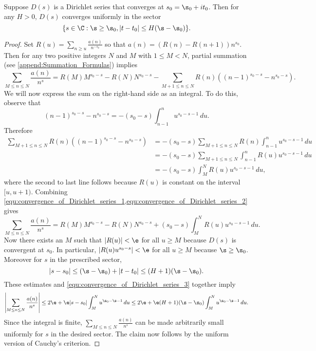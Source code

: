    \begin{theorem}\label{thm:convergence_of_Dirichlet_series}
      Suppose $D(s)$ is a Dirichlet series that converges at $s_{0} = \s_{0}+it_{0}$. Then for any $H > 0$, $D(s)$ converges uniformly in the sector
      \[
        \{s \in \C:\s \ge \s_{0}, |t-t_{0}| \le H(\s-\s_{0})\}.
      \]
    \end{theorem}
    \begin{proof}
      Set $R(u) = \sum_{n \ge u}\frac{a(n)}{n^{-s_{0}}}$ so that $a(n) = (R(n)-R(n+1))n^{s_{0}}$. Then for any two positive integers $N$ and $M$ with $1 \le M < N$, partial summation (see \cref{append:Summation_Formulas}) implies
      \begin{equation}\label{equ:convergence_of_Dirichlet_series_1}
        \sum_{M \le n \le N}\frac{a(n)}{n^{s}} = R(M)M^{s_{0}-s}-R(N)N^{s_{0}-s}-\sum_{M+1 \le n \le N}R(n)((n-1)^{s_{0}-s}-n^{s_{0}-s}).
      \end{equation}
      We will now express the sum on the right-hand side as an integral. To do this, observe that
      \[
        (n-1)^{s_{0}-s}-n^{s_{0}-s} = -(s_{0}-s)\int_{n-1}^{n}u^{s_{0}-s-1}\,du.
      \]
      Therefore
      \begin{equation}\label{equ:convergence_of_Dirichlet_series_2}
        \begin{aligned}
          \sum_{M+1 \le n \le N}R(n)((n-1)^{s_{0}-s}-n^{s_{0}-s}) &= -(s_{0}-s)\sum_{M+1 \le n \le N}R(n)\int_{n-1}^{n}u^{s_{0}-s-1}\,du \\
          &= -(s_{0}-s)\sum_{M+1 \le n \le N}\int_{n-1}^{n}R(u)u^{s_{0}-s-1}\,du \\
          &= -(s_{0}-s)\int_{M}^{N}R(u)u^{s_{0}-s-1}\,du,
        \end{aligned}
      \end{equation}
      where the second to last line follows because $R(u)$ is constant on the interval $[u,u+1)$. Combining \cref{equ:convergence_of_Dirichlet_series_1,equ:convergence_of_Dirichlet_series_2} gives
      \begin{equation}\label{equ:convergence_of_Dirichlet_series_3}
        \sum_{M \le n \le N}\frac{a(n)}{n^{s}} = R(M)M^{s_{0}-s}-R(N)N^{s_{0}-s}+(s_{0}-s)\int_{M}^{N}R(u)u^{s_{0}-s-1}\,du.
      \end{equation}
      Now there exists an $M$ such that $|R(u)| < \e$ for all $u \ge M$ because $D(s)$ is convergent at $s_{0}$. In particular, $|R(u)u^{s_{0}-s}| < \e$ for all $u \ge M$ because $\s \ge \s_{0}$. Moreover for $s$ in the prescribed sector,
      \[
        |s-s_{0}| \le (\s-\s_{0})+|t-t_{0}| \le (H+1)(\s-\s_{0}).
      \]
      These estimates and \cref{equ:convergence_of_Dirichlet_series_3} together imply
      \[
        \left|\sum_{M \le n \le N}\frac{a(n)}{n^{s}}\right| \le 2\e+\e|s-s_{0}|\int_{M}^{N}u^{\s_{0}-\s-1}\,du \le 2\e+\e(H+1)(\s-\s_{0})\int_{M}^{N}u^{\s_{0}-\s-1}\,du.
      \]
      Since the integral is finite, $\sum_{M \le n \le N}\frac{a(n)}{n^{s}}$ can be made arbitrarily small uniformly for $s$ in the desired sector. The claim now follows by the uniform version of Cauchy's criterion.
    \end{proof}
    
